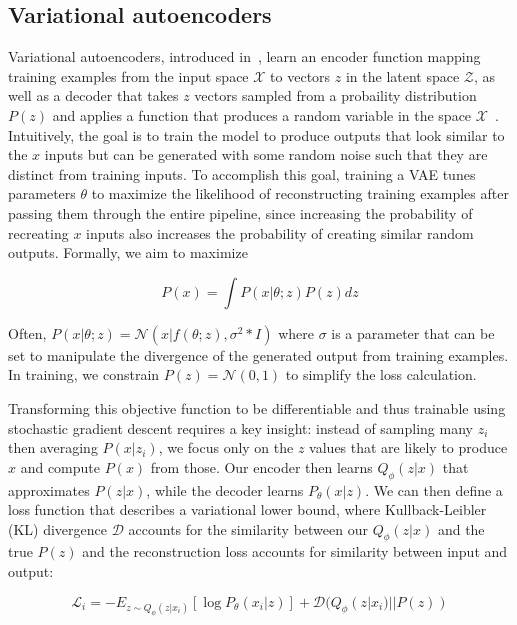 \subsection{Variational autoencoders}
Variational autoencoders, introduced in~\cite{kingma2013auto}, learn an encoder function mapping training examples from the input space $\mathcal{X}$ to vectors $z$ in the latent space $\mathcal{Z}$, as well as a decoder that takes $z$ vectors sampled from a probaility distribution $P(z)$ and applies a function that produces a random variable in the space $\mathcal{X}$~\cite{doersch2016tutorial}.
Intuitively, the goal is to train the model to produce outputs that look similar to the $x$ inputs but can be generated with some random noise such that they are distinct from training inputs.
To accomplish this goal, training a VAE tunes parameters $\theta$ to maximize the likelihood of reconstructing training examples after passing them through the entire pipeline, since increasing the probability of recreating $x$ inputs also increases the probability of creating similar random outputs.
Formally, we aim to maximize

\begin{equation}
    P(x) = \int P(x|\theta; z) P(z) dz
\end{equation}

Often, $P(x|\theta; z) = \mathcal{N}(x|f(\theta; z), \sigma^2 *I)$ where $\sigma$ is a parameter that can be set to manipulate the divergence of the generated output from training examples. In training, we constrain $P(z) = \mathcal{N}(0, 1)$ to simplify the loss calculation. 

Transforming this objective function to be differentiable and thus trainable using stochastic gradient descent requires a key insight: instead of sampling many $z_i$ then averaging $P(x|z_i)$, we focus only on the $z$ values that are likely to produce $x$ and compute $P(x)$ from those.
Our encoder then learns $Q_\phi(z|x)$ that approximates $P(z|x)$, while the decoder learns $P_\theta(x|z)$.
We can then define a loss function that describes a variational lower bound, where Kullback-Leibler (KL) divergence $\mathcal{D}$ accounts for the similarity between our $Q_\phi(z|x)$ and the true $P(z)$ and the reconstruction loss accounts for similarity between input and output:

\begin{equation}
    \mathcal{L}_i = -E_{z\sim Q_\phi(z|x_i)} [\log P_\theta(x_i|z)] + \mathcal{D}(Q_\phi(z|x_i)||P(z))
\end{equation}

